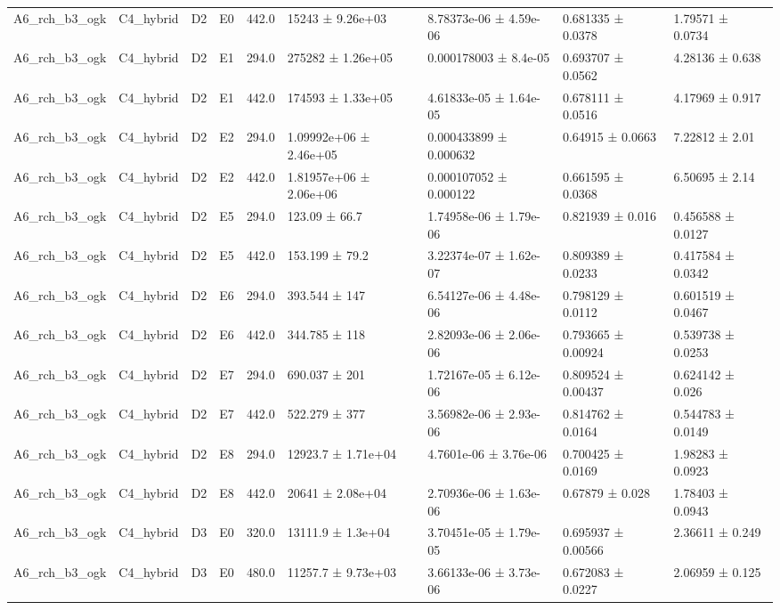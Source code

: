 \begin{table}
\begin{tabular}{lllllllll}
A6\_rch\_b3\_ogk & C4\_hybrid & D2 & E0 & 442.0 & 15243 ± 9.26e+03 & 8.78373e-06 ± 4.59e-06 & 0.681335 ± 0.0378 & 1.79571 ± 0.0734 \\
A6\_rch\_b3\_ogk & C4\_hybrid & D2 & E1 & 294.0 & 275282 ± 1.26e+05 & 0.000178003 ± 8.4e-05 & 0.693707 ± 0.0562 & 4.28136 ± 0.638 \\
A6\_rch\_b3\_ogk & C4\_hybrid & D2 & E1 & 442.0 & 174593 ± 1.33e+05 & 4.61833e-05 ± 1.64e-05 & 0.678111 ± 0.0516 & 4.17969 ± 0.917 \\
A6\_rch\_b3\_ogk & C4\_hybrid & D2 & E2 & 294.0 & 1.09992e+06 ± 2.46e+05 & 0.000433899 ± 0.000632 & 0.64915 ± 0.0663 & 7.22812 ± 2.01 \\
A6\_rch\_b3\_ogk & C4\_hybrid & D2 & E2 & 442.0 & 1.81957e+06 ± 2.06e+06 & 0.000107052 ± 0.000122 & 0.661595 ± 0.0368 & 6.50695 ± 2.14 \\
A6\_rch\_b3\_ogk & C4\_hybrid & D2 & E5 & 294.0 & 123.09 ± 66.7 & 1.74958e-06 ± 1.79e-06 & 0.821939 ± 0.016 & 0.456588 ± 0.0127 \\
A6\_rch\_b3\_ogk & C4\_hybrid & D2 & E5 & 442.0 & 153.199 ± 79.2 & 3.22374e-07 ± 1.62e-07 & 0.809389 ± 0.0233 & 0.417584 ± 0.0342 \\
A6\_rch\_b3\_ogk & C4\_hybrid & D2 & E6 & 294.0 & 393.544 ± 147 & 6.54127e-06 ± 4.48e-06 & 0.798129 ± 0.0112 & 0.601519 ± 0.0467 \\
A6\_rch\_b3\_ogk & C4\_hybrid & D2 & E6 & 442.0 & 344.785 ± 118 & 2.82093e-06 ± 2.06e-06 & 0.793665 ± 0.00924 & 0.539738 ± 0.0253 \\
A6\_rch\_b3\_ogk & C4\_hybrid & D2 & E7 & 294.0 & 690.037 ± 201 & 1.72167e-05 ± 6.12e-06 & 0.809524 ± 0.00437 & 0.624142 ± 0.026 \\
A6\_rch\_b3\_ogk & C4\_hybrid & D2 & E7 & 442.0 & 522.279 ± 377 & 3.56982e-06 ± 2.93e-06 & 0.814762 ± 0.0164 & 0.544783 ± 0.0149 \\
A6\_rch\_b3\_ogk & C4\_hybrid & D2 & E8 & 294.0 & 12923.7 ± 1.71e+04 & 4.7601e-06 ± 3.76e-06 & 0.700425 ± 0.0169 & 1.98283 ± 0.0923 \\
A6\_rch\_b3\_ogk & C4\_hybrid & D2 & E8 & 442.0 & 20641 ± 2.08e+04 & 2.70936e-06 ± 1.63e-06 & 0.67879 ± 0.028 & 1.78403 ± 0.0943 \\
A6\_rch\_b3\_ogk & C4\_hybrid & D3 & E0 & 320.0 & 13111.9 ± 1.3e+04 & 3.70451e-05 ± 1.79e-05 & 0.695937 ± 0.00566 & 2.36611 ± 0.249 \\
A6\_rch\_b3\_ogk & C4\_hybrid & D3 & E0 & 480.0 & 11257.7 ± 9.73e+03 & 3.66133e-06 ± 3.73e-06 & 0.672083 ± 0.0227 & 2.06959 ± 0.125 \\

\end{tabular}
\end{table}

